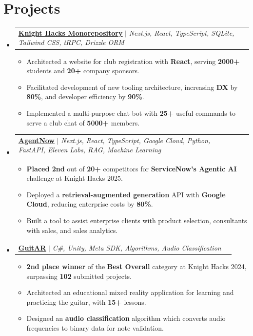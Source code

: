 \documentclass[letterpaper,11pt]{article}
\makeatletter
\newcommand{\resumeItem}[1]{
  \item\small{
    {#1 \vspace{-2pt}}
  }
}
\newcommand{\resumeProjectHeading}[2]{
    \item
    \begin{tabular*}{0.97\textwidth}{l@{\extracolsep{\fill}}r}
      \small#1\\
    \end{tabular*}\vspace{-7pt}
}
\newcommand{\resumeSubHeadingListStart}{\begin{itemize}[leftmargin=0.15in, label={}]}
\newcommand{\resumeSubHeadingListEnd}{\end{itemize}}
\newcommand{\resumeItemListStart}{\begin{itemize}}
\newcommand{\resumeItemListEnd}{\end{itemize}\vspace{-7pt}}
\makeatother
\begin{document}
\section{Projects}
    \resumeSubHeadingListStart
        \resumeProjectHeading
        {\textbf{\href{https://github.com/KnightHacks/forge}{\underline{Knight Hacks Monorepository}}} $|$ \emph{Next.js, React, TypeScript, SQLite, Tailwind CSS, tRPC, Drizzle ORM}}{June 2021 -- Present}
        \resumeItemListStart
        \resumeItem{Architected a website for club registration with \textbf{React}, serving \textbf{2000+} students and \textbf{20+} company sponsors.}
        \resumeItem{Facilitated development of new tooling architecture, increasing \textbf{DX} by \textbf{80\%}, and developer efficiency by \textbf{90\%}.}
        \resumeItem{Implemented a multi-purpose chat bot with \textbf{25+} useful commands to serve a club chat of \textbf{5000+} members.}
        \resumeItemListEnd
      \resumeProjectHeading
        {\textbf{\href{https://devpost.com/software/agentnow}{\underline{AgentNow}}} $|$ \emph{Next.js, React, TypeScript, Google Cloud, Python, FastAPI, Eleven Labs, RAG, Machine Learning}}{June 2021 -- Present}
          \resumeItemListStart
            \resumeItem{\textbf{Placed 2nd} out of \textbf{20+} competitors for \textbf{ServiceNow's Agentic AI} challenge at Knight Hacks 2025.}
            \resumeItem{Deployed a \textbf{retrieval-augmented generation} API with \textbf{Google Cloud}, reducing enterprise costs by \textbf{80\%}.}
            \resumeItem{Built a tool to assist enterprise clients with product selection, consultants with sales, and sales analytics.}
          \resumeItemListEnd
        \resumeProjectHeading
        {\textbf{\href{https://devpost.com/software/guitar-o3gw19}{\underline{GuitAR}}} $|$ \emph{C\#, Unity, Meta SDK, Algorithms, Audio Classification }}{June 2021 -- Present}
        \resumeItemListStart
          \resumeItem{\textbf{2nd place winner} of the \textbf{Best Overall} category at Knight Hacks 2024, surpassing \textbf{102} submitted projects.}
          \resumeItem{Architected an educational mixed reality application for learning and practicing the guitar, with \textbf{15+} lessons.}
          \resumeItem{Designed an \textbf{audio classification} algorithm which converts audio frequencies to binary data for note validation.}
        \resumeItemListEnd
    \resumeSubHeadingListEnd
%

\end{document}
